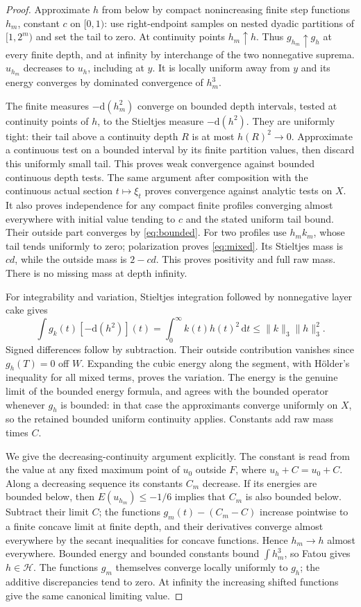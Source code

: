 \documentclass[11pt]{article}
\begin{document}
\begin{proof}
Approximate $h$ from below by compact nonincreasing finite step functions
$h_m$, constant $c$ on $[0,1)$: use right-endpoint samples on nested
dyadic partitions of $[1,2^m)$ and set the tail to zero. At continuity
points $h_m\uparrow h$. Thus $g_{h_m}\uparrow g_h$ at every finite depth,
and at infinity by interchange of the two nonnegative suprema.
$u_{h_m}$ decreases to $u_h$, including at $y$. It is locally uniform
away from $y$ and its energy converges by dominated convergence of $h_m^3$.

The finite measures $-\mathrm d(h_m^2)$ converge on bounded depth
intervals, tested at continuity points of $h$, to the Stieltjes measure
$-\mathrm d(h^2)$. They are uniformly tight: their tail above a continuity
depth $R$ is at most $h(R)^2\to0$. Approximate a continuous test on a
bounded interval by its finite partition values, then discard this
uniformly small tail. This proves weak convergence against bounded
continuous depth tests. The same argument after composition with the
continuous actual section $t\mapsto\xi_t$ proves convergence against
analytic tests on $X$. It also proves independence for any compact finite
profiles converging almost everywhere with initial value tending to $c$
and the stated uniform tail bound. Their outside part converges by
\eqref{eq:bounded}. For two profiles use $h_mk_m$, whose tail tends
uniformly to zero; polarization proves \eqref{eq:mixed}. Its Stieltjes
mass is $cd$, while the outside mass is $2-cd$. This proves positivity
and full raw mass. There is no missing mass at depth infinity.

For integrability and variation, Stieltjes integration followed by
nonnegative layer cake gives
\[
 \int g_k(t)[-\mathrm d(h^2)](t)=\int_0^\infty k(t)h(t)^2\,\mathrm dt
                         \leq\|k\|_3\|h\|_3^2.
\]
Signed differences follow by subtraction. Their outside contribution
vanishes since $g_h(T)=0$ off $W$. Expanding the cubic energy along the
segment, with H\"older's inequality for all mixed terms, proves the
variation. The energy is the genuine limit of the bounded energy
formula, and agrees with the bounded operator whenever $g_h$ is bounded:
in that case the approximants converge uniformly on $X$, so the retained
bounded uniform continuity applies. Constants add raw mass times $C$.

We give the decreasing-continuity argument explicitly. The constant is
read from the value at any fixed maximum point of $u_0$ outside $F$,
where $u_h+C=u_0+C$. Along a decreasing sequence its constants $C_m$
decrease. If its energies are bounded below, then
$E(u_{h_m})\leq-1/6$ implies that $C_m$ is also bounded below.
Subtract their limit $C$; the functions
$g_m(t)-(C_m-C)$ increase pointwise to a finite concave limit at finite
depth, and their derivatives converge almost everywhere by the secant
inequalities for concave functions. Hence $h_m\to h$ almost everywhere.
Bounded energy and bounded constants bound $\int h_m^3$, so Fatou gives
$h\in\mathcal H$. The functions $g_m$ themselves converge locally
uniformly to $g_h$; the additive discrepancies tend to zero. At infinity
the increasing shifted functions give the same canonical limiting value.


\end{proof}
\end{document}
